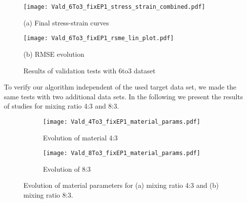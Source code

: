     
    \begin{figure}[H]
        \centering
        \begin{minipage}[t]{0.495\textwidth}
            \centering
            \texttt{[image: Vald\_6To3\_fixEP1\_stress\_strain\_combined.pdf]}
            \caption*{(a) Final stress-strain curves}
            \label{fig:validationStressStrain6to3}
        \end{minipage}
        \hfill
        \begin{minipage}[t]{0.495\textwidth}
            \centering
            \texttt{[image: Vald\_6To3\_fixEP1\_rsme\_lin\_plot.pdf]}
            \caption*{(b) RMSE evolution}
            \label{subfigure:validation-rmse-6to3}
        \end{minipage}
        \caption{Results of validation tests with 6to3 dataset}
        \label{fig:validation results 6to3}
    \end{figure}
    


    To verify our algorithm independent of the used target data set, we made the same tests with two additional data sets. In the following we present the results of studies for mixing ratio 4:3 and 8:3. 


    \begin{figure}[H]
    \centering

    \begin{subfigure}[t]{1.0\textwidth}
        \centering
        \texttt{[image: Vald\_4To3\_fixEP1\_material\_params.pdf]}
        \caption{Evolution of material 4:3}
        \label{fig:material_params_4to3}
    \end{subfigure}
    \begin{subfigure}[t]{1.0\textwidth}
        \centering
        \texttt{[image: Vald\_8To3\_fixEP1\_material\_params.pdf]}
        \caption{Evolution of 8:3}
        \label{fig:material_params_8to3}
    \end{subfigure}

    \caption{Evolution of material parameters for (a) mixing ratio 4:3 and (b) mixing ratio 8:3.}
    \label{fig:validation_material_params}
\end{figure}


